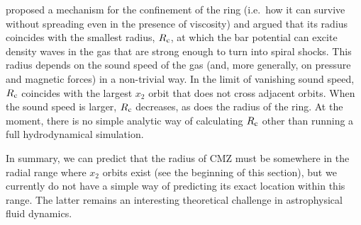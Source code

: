 \cite{Sormani2018a} proposed a mechanism for the confinement of the ring (i.e.\ how it can survive without spreading even in the presence of viscosity) and argued that its radius coincides with the smallest radius, $R_{\rm c}$, at which the bar potential can excite density waves in the gas that are strong enough to turn into spiral shocks. This radius depends on the sound speed of the gas (and, more generally, on pressure and magnetic forces) in a non-trivial way. In the limit of vanishing sound speed, $R_{\rm c}$ coincides with the largest $x_2$ orbit that does not cross adjacent orbits. When the sound speed is larger, $R_{\rm c}$ decreases, as does the radius of the ring. At the moment, there is no simple analytic way of calculating $R_{\rm c}$ other than running a full hydrodynamical simulation.

In summary, we can predict that the radius of CMZ must be somewhere in the radial range where $x_2$ orbits exist (see the beginning of this section), but we currently do not have a simple way of predicting its exact location within this range. The latter remains an interesting theoretical challenge in astrophysical fluid dynamics.  

